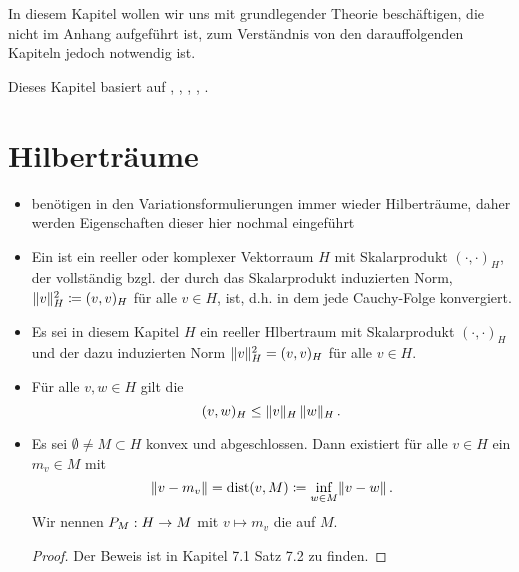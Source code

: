 \label{sec:Grundlagen}

In diesem Kapitel wollen wir uns mit grundlegender Theorie beschäftigen, die nicht im Anhang aufgeführt ist, zum Verständnis von den darauffolgenden Kapiteln jedoch notwendig ist.

Dieses Kapitel basiert auf \cite{BraeFEM}, \cite{StarkePDE}, \cite{EPS}, \cite{Walker}, \cite{AltKonti}.

\section{Hilberträume}

\begin{itemize}
\item benötigen in den Variationsformulierungen immer wieder Hilberträume, daher werden Eigenschaften dieser hier nochmal eingeführt
\item \begin{defi}
Ein \textit{} ist ein reeller oder komplexer Vektorraum $H$ mit Skalarprodukt $(\cdot, \cdot)_H$, der vollständig bzgl. der durch das Skalarprodukt induzierten Norm, $\lVert v\rVert_H^2 \coloneqq{(v,v)_H}$ für alle $v \in H$, ist, d.h. in dem jede Cauchy-Folge konvergiert.
\end{defi}

\item Es sei in diesem Kapitel $H$ ein reeller Hlbertraum mit Skalarprodukt $(\cdot,\cdot)_H$ und der dazu induzierten Norm $\lVert v\rVert_H^2 = (v,v)_H$ für alle $v \in H$.

\item \begin{bem*}
Für alle $v,w \in H$ gilt die 
\[
	(v,w)_H \le \lVert v\rVert_H \, \lVert w\rVert_H \, .
\]
\end{bem*}

\item \begin{satz}
Es sei $\emptyset\neq M\subset H$ konvex und abgeschlossen. Dann existiert für alle $v\in H$ ein $m_v\in M$ mit
\[ 
  	\lVert v-m_v\rVert=\operatorname{dist}(v,M)\coloneqq \inf_{w\in M}\lVert v-w\rVert\, .
\]
Wir nennen $P_M:H\rightarrow M$ mit $v\mapsto m_v$ die  auf $M$.
\end{satz}

\begin{proof}
Der Beweis ist in \cite{Walker} Kapitel 7.1 Satz 7.2 zu finden.
\end{proof}


\end{itemize}
